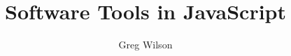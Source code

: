 \documentclass[krantzl]{_tex/krantz}
\begin{document}
\title{Software Tools in JavaScript}
\author{Greg Wilson}
\maketitle

\frontmatter
\tableofcontents

\mainmatter
\end{document}
